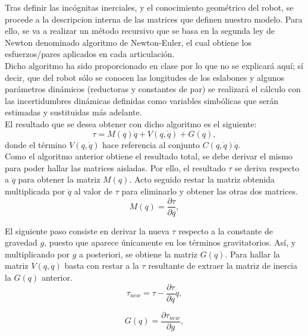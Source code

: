 \newpage

Tras definir las incógnitas inerciales, y el conocimiento geométrico del robot, se procede a la descripcion interna de las matrices que definen nuestro modelo. Para ello, se va a realizar un método recursivo que se basa en la segunda ley de Newton denominado algoritmo de Newton-Euler, el cual obtiene los esfuerzos/pares aplicados en cada articulación.\\
 Dicho algoritmo ha sido proporcionado en clase por lo que no se explicará aquí; sí decir, que del robot sólo se conocen las longitudes de los eslabones y algunos parámetros dinámicos (reductoras y constantes de par) se realizará el cálculo con las incertidumbres dinámicas definidas como variables simbólicas que serán estimadas y sustituidas más adelante.\\

El resultado que se desea obtener con dicho algoritmo es el siguiente:\\
\begin{equation}
\tau=M(q)\ddot{q}+V(q,\dot{q})+G(q),
\end{equation}
donde el término $V(q,\dot{q})$ hace referencia al conjunto $C(q,\dot{q})\dot{q}$.\\

Como el algoritmo anterior obtiene el resultado total, se debe derivar el mismo para poder hallar las matrices aisladas. Por ello, el resultado $\tau$ se deriva respecto a $\ddot{q}$ para obtener la matriz $M(q)$. Acto seguido restar la matriz obtenida multiplicada por $\ddot{q}$ al valor de $\tau$ para eliminarlo y obtener las otras dos matrices.\\
\begin{equation}
M(q)=\dfrac{\partial{\tau}}{\partial{\ddot{q}}},
\end{equation}

El siguiente paso consiste en derivar la nueva $\tau$ respecto a la constante de gravedad $g$, puesto que aparece únicamente en los términos gravitatorios. Así, y multiplicando por $g$ a posteriori, se obtiene la matriz $G(q)$. Para hallar la matriz $V(q,\dot{q})$ basta con restar a la $\tau$ resultante de extraer la matriz de inercia la $G(q)$ anterior.\\
\begin{equation}
\tau_{new}=\tau-\dfrac{\partial{\tau}}{\partial{\ddot{q}}}\ddot{q},
\end{equation}

\begin{equation}
G(q)=\dfrac{\partial{\tau_{new}}}{\partial{g}},
\end{equation}

